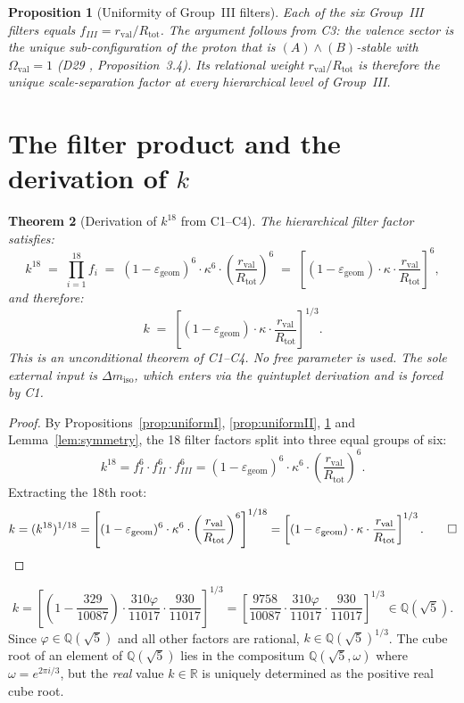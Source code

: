 \documentclass[12pt,a4paper]{article}
\theoremstyle{plain}
\newtheorem{theorem}{Theorem}[section]
\newtheorem{proposition}[theorem]{Proposition}
\theoremstyle{definition}
\theoremstyle{remark}
\newenvironment{epsbox}[1][]{%
\begin{tcolorbox}[epsstyle,title={Key Result\ifx\relax#1\relax\else: #1\fi}]}{\end{tcolorbox}}
\newcommand{\vp}{\varphi}
\newcommand{\kap}{\kappa}
\newcommand{\rval}{r_{\mathrm{val}}}
\newcommand{\Rtot}{R_{\mathrm{tot}}}
\newcommand{\egeom}{\varepsilon_{\mathrm{geom}}}
\newcommand{\dmiso}{\Delta m_{\mathrm{iso}}}
\begin{document}
\begin{proposition}[Uniformity of Group~III filters]
\label{prop:uniformIII}
Each of the six Group~III filters equals $f_{III} = \rval/\Rtot$. The argument follows from C3: the valence sector is the unique sub-configuration of the proton that is $(A)\wedge(B)$-stable with $\Omega_{\mathrm{val}}=1$ (D29 \citep{D29}, Proposition~3.4). Its relational weight $\rval/\Rtot$ is therefore the unique scale-separation factor at every hierarchical level of Group~III.
\end{proposition}

\section{The filter product and the derivation of \texorpdfstring{$k$}{k}}
\label{sec:product}

\begin{theorem}[Derivation of $k^{18}$ from C1--C4]
\label{thm:k18}
The hierarchical filter factor satisfies:
\[
k^{18} \;=\; \prod_{i=1}^{18} f_i \;=\; (1-\egeom)^6 \cdot \kap^6 \cdot \left(\frac{\rval}{\Rtot}\right)^6 \;=\; \left[(1-\egeom)\cdot\kap\cdot\frac{\rval}{\Rtot}\right]^6,
\]
and therefore:
\[
k \;=\; \left[(1-\egeom)\cdot\kap\cdot\frac{\rval}{\Rtot}\right]^{1/3}.
\]
This is an unconditional theorem of C1--C4. No free parameter is used. The sole external input is $\dmiso$, which enters via the quintuplet derivation \citep{D43} and is forced by C1.
\end{theorem}

\begin{proof}
By Propositions~\ref{prop:uniformI}, \ref{prop:uniformII}, \ref{prop:uniformIII} and Lemma~\ref{lem:symmetry}, the 18 filter factors split into three equal groups of six:
\[
k^{18} = f_I^6 \cdot f_{II}^6 \cdot f_{III}^6 = (1-\egeom)^6 \cdot \kap^6 \cdot \left(\frac{\rval}{\Rtot}\right)^6.
\]
Extracting the 18th root:
\[
k = (k^{18})^{1/18} = \left[(1-\egeom)^6\cdot\kap^6\cdot\left(\frac{\rval}{\Rtot}\right)^6\right]^{1/18} = \left[(1-\egeom)\cdot\kap\cdot\frac{\rval}{\Rtot}\right]^{1/3}.\qed
\]
\end{proof}

\begin{epsbox}[Analytic expression for $k$]
\label{box:k}
\[
k = \left[\left(1 - \frac{329}{10087}\right)\cdot\frac{310\vp}{11017}\cdot\frac{930}{11017}\right]^{1/3} = \left[\frac{9758}{10087}\cdot\frac{310\vp}{11017}\cdot\frac{930}{11017}\right]^{1/3} \in \mathbb{Q}(\sqrt{5}).
\]
Since $\vp\in\mathbb{Q}(\sqrt{5})$ and all other factors are rational, $k\in\mathbb{Q}(\sqrt{5})^{1/3}$. The cube root of an element of $\mathbb{Q}(\sqrt{5})$ lies in the compositum $\mathbb{Q}(\sqrt{5},\omega)$ where $\omega = e^{2\pi i/3}$, but the \emph{real} value $k\in\mathbb{R}$ is uniquely determined as the positive real cube root.
\end{epsbox}
\end{document}
